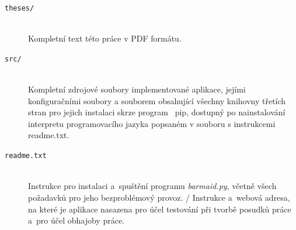 \documentclass[
  program=inf,
biblatex=false,
sourcecodes=true,
joinlists=true,
  figures=true,
  tables=true,
  glossaries=true,
  index=false
]{kidiplom}
\begin{document}
\begin{description}

\item[\texttt{theses/}] \hfill \\
  Kompletní text této práce v PDF formátu.

\item[\texttt{src/}] \hfill \\
  Kompletní zdrojové soubory implementované aplikace, jejími konfiguračními soubory
  a souborem obsahující všechny knihovny třetích stran pro jejich instalaci
  skrze program {\ pip}, dostupný po nainstalování interpretu programovacího
  jazyka popsaném v souboru s instrukcemi readme.txt. 

\item[\texttt{readme.txt}] \hfill \\
  Instrukce pro instalaci a~spuštění programu {\it barmaid.py}, včetně
  všech požadavků pro jeho bezproblémový provoz. / Instrukce a~webová adresa, na
  které je aplikace nasazena pro účel testování při tvorbě posudků
  práce a~pro účel obhajoby práce.

\end{description}



\printglossary


\nocite{*}
\end{document}
